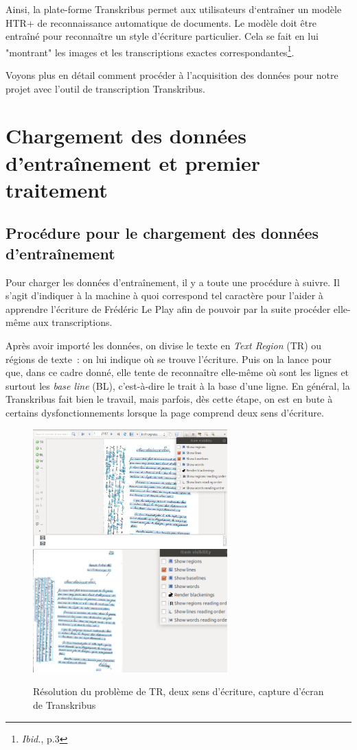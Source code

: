 Ainsi, la plate-forme Transkribus permet aux utilisateurs d‘entraîner un modèle HTR+ de reconnaissance automatique de documents. Le modèle doit être entraîné pour reconnaître un style d'écriture particulier. Cela se fait en lui "montrant" les images et les transcriptions exactes correspondantes\footnote{\emph{Ibid.}, p.3}.

Voyons plus en détail comment procéder à l'acquisition des données pour notre projet avec l'outil de transcription Transkribus.

\section{Chargement des données d'entraînement et premier traitement}

\subsection{Procédure pour le chargement des données d'entraînement}

Pour charger les données d'entraînement, il y a toute une procédure à suivre. Il s'agit d'indiquer à la machine à quoi correspond tel caractère pour l'aider à apprendre l'écriture de Frédéric Le Play afin de pouvoir par la suite procéder elle-même aux transcriptions. 

Après avoir importé les données, on divise le texte en \emph{Text Region} (TR) ou régions de texte~: on lui indique où se trouve l'écriture. Puis on la lance pour que, dans ce cadre donné, elle tente de reconnaître elle-même où sont les lignes et surtout les \emph{base line} (BL), c'est-à-dire le trait à la base d'une ligne. En général, la Transkribus fait bien le travail, mais parfois, dès cette étape, on est en bute à certains dysfonctionnements lorsque la page comprend deux sens d'écriture.  

\begin{figure}[H]
    \caption{Résolution du problème de TR, deux sens d'écriture, capture d'écran de Transkribus}
    \centering
    \includegraphics[width=7.5cm]{images/trTranskribus.png}
    \includegraphics[width=7.5cm]{images/trCorrTranskribus.png}
\end{figure}

